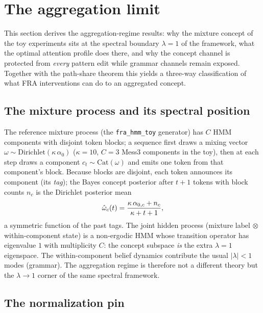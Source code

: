 \documentclass{article}
\begin{document}
\section{The aggregation limit}\label{sec:agg}

This section derives the aggregation-regime results: why the mixture concept of the toy experiments sits at the spectral boundary $\lambda = 1$ of the framework, what the optimal attention profile does there, and why the concept channel is protected from \emph{every} pattern edit while grammar channels remain exposed. Together with the path-share theorem this yields a three-way classification of what FRA interventions can do to an aggregated concept.

\subsection{The mixture process and its spectral position}

The reference mixture process (the \texttt{fra\_hmm\_toy} generator) has $C$ HMM components with disjoint token blocks; a sequence first draws a mixing vector $\omega \sim \mathrm{Dirichlet}(\kappa\,\alpha_0)$ ($\kappa = 10$, $C = 3$ Mess3 components in the toy), then at each step draws a component $c_t \sim \mathrm{Cat}(\omega)$ and emits one token from that component's block. Because blocks are disjoint, each token announces its component (its \emph{tag}); the Bayes concept posterior after $t{+}1$ tokens with block counts $n_c$ is the Dirichlet posterior mean
\begin{equation}\label{eq:omegahat}
    \hat{\omega}_c(t) = \frac{\kappa\,\alpha_{0,c} + n_c}{\kappa + t + 1} ,
\end{equation}
a symmetric function of the past tags. The joint hidden process (mixture label $\otimes$ within-component state) is a non-ergodic HMM whose transition operator has eigenvalue $1$ with multiplicity $C$: the concept subspace \emph{is} the extra $\lambda = 1$ eigenspace. The within-component belief dynamics contribute the usual $|\lambda| < 1$ modes (grammar). The aggregation regime is therefore not a different theory but the $\lambda \to 1$ corner of the same spectral framework.

\subsection{The normalization pin}
\end{document}
